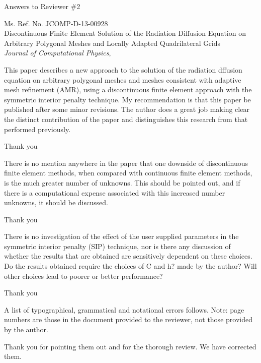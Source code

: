 \documentclass{article}
\begin{document}
\begin{center}
{ \Large Answers to Reviewer \#2}
\end{center}

\bigskip

\noindent Ms. Ref. No. JCOMP-D-13-00928\\
Discontinuous Finite Element Solution of the Radiation Diffusion Equation on Arbitrary Polygonal Meshes and Locally Adapted Quadrilateral Grids\\
{\it Journal of Computational Physics},\\

\bigskip
\bigskip

{
\color{blue}
This paper describes a new approach to the solution of the radiation dffusion
equation on arbitrary polygonal meshes and meshes consistent with adaptive
mesh refinement (AMR), using a discontinuous finite element approach with the
symmetric interior penalty technique. My recommendation is that this paper
be published after some minor revisions. The author does a great job making
clear the distinct contribution of the paper and distinguishes this research from
that performed previously.
}

Thank you
\bigskip


{
\color{blue}
There is no mention anywhere in the paper that one downside of discontinuous finite element methods, when compared with continuous finite
element methods, is the much greater number of unknowns. This should
be pointed out, and if there is a computational expense associated with
this increased number unknowns, it should be discussed.
}

Thank you
\bigskip


{
\color{blue}
There is no investigation of the effect of the user supplied parameters in
the symmetric interior penalty (SIP) technique, nor is there any discussion
of whether the results that are obtained are sensitively dependent on these
choices. Do the results obtained require the choices of C and h? made by
the author? Will other choices lead to poorer or better performance?
}


Thank you
\bigskip


{
\color{blue}
A list of typographical, grammatical and notational errors follows. Note:
page numbers are those in the document provided to the reviewer, not those
provided by the author.
}

Thank you for pointing them out and for the thorough review. We have corrected them.

\bigskip
\end{document}
